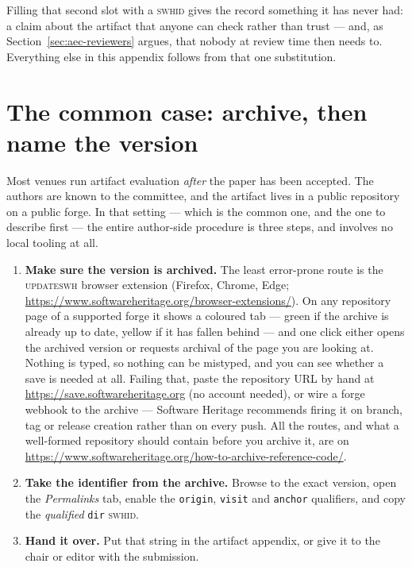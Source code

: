 
Filling that second slot with a \textsc{swhid} gives the record something it has never had: a
claim about the artifact that anyone can check rather than trust --- and, as
Section~\ref{sec:aec-reviewers} argues, that nobody at review time then needs to. Everything else
in this appendix follows from that one substitution.

\section{The common case: archive, then name the version}
\label{sec:aec-common}

Most venues run artifact evaluation \emph{after} the paper has been accepted. The authors are
known to the committee, and the artifact lives in a public repository on a public forge. In that
setting --- which is the common one, and the one to describe first --- the entire author-side
procedure is three steps, and involves no local tooling at all.

\begin{enumerate}[nosep,leftmargin=*]
  \item \textbf{Make sure the version is archived.} The least error-prone route is the
        \textsc{updateswh} browser extension (Firefox, Chrome, Edge;
        \url{https://www.softwareheritage.org/browser-extensions/}). On any repository page of a
        supported forge it shows a coloured tab --- green if the archive is already up to date,
        yellow if it has fallen behind --- and one click either opens the archived version or
        requests archival of the page you are looking at. Nothing is typed, so nothing can be
        mistyped, and you can see whether a save is needed at all. Failing that, paste the
        repository URL by hand at \url{https://save.softwareheritage.org} (no account needed), or
        wire a forge webhook to the archive --- Software Heritage recommends firing it on branch,
        tag or release creation rather than on every push. All the routes, and what a
        well-formed repository should contain before you archive it, are on
        \url{https://www.softwareheritage.org/how-to-archive-reference-code/}.
  \item \textbf{Take the identifier from the archive.} Browse to the exact version, open the
        \emph{Permalinks} tab, enable the \texttt{origin}, \texttt{visit} and \texttt{anchor}
        qualifiers, and copy the \emph{qualified} \texttt{dir} \textsc{swhid}.
  \item \textbf{Hand it over.} Put that string in the artifact appendix, or give it to the chair
        or editor with the submission.
\end{enumerate}

